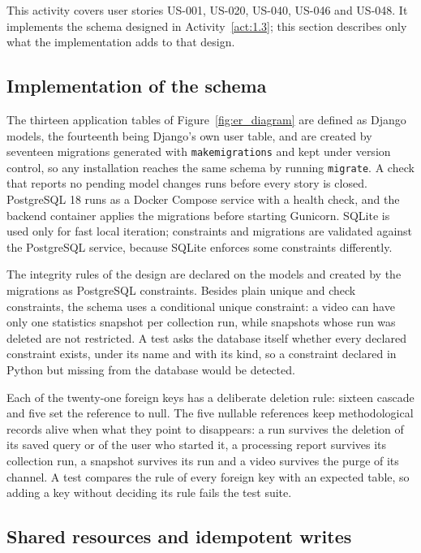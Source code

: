This activity covers user stories US-001, US-020, US-040, US-046 and US-048. It implements the schema designed in Activity~\ref{act:1.3}; this section describes only what the implementation adds to that design.

\subsection{Implementation of the schema}

The thirteen application tables of Figure~\ref{fig:er_diagram} are defined as Django models, the fourteenth being Django's own user table, and are created by seventeen migrations generated with \texttt{makemigrations} and kept under version control, so any installation reaches the same schema by running \texttt{migrate}. A check that reports no pending model changes runs before every story is closed. PostgreSQL 18 runs as a Docker Compose service with a health check, and the backend container applies the migrations before starting Gunicorn. SQLite is used only for fast local iteration; constraints and migrations are validated against the PostgreSQL service, because SQLite enforces some constraints differently.

The integrity rules of the design are declared on the models and created by the migrations as PostgreSQL constraints. Besides plain unique and check constraints, the schema uses a conditional unique constraint: a video can have only one statistics snapshot per collection run, while snapshots whose run was deleted are not restricted. A test asks the database itself whether every declared constraint exists, under its name and with its kind, so a constraint declared in Python but missing from the database would be detected.

Each of the twenty-one foreign keys has a deliberate deletion rule: sixteen cascade and five set the reference to null. The five nullable references keep methodological records alive when what they point to disappears: a run survives the deletion of its saved query or of the user who started it, a processing report survives its collection run, a snapshot survives its run and a video survives the purge of its channel. A test compares the rule of every foreign key with an expected table, so adding a key without deciding its rule fails the test suite.

\subsection{Shared resources and idempotent writes}

